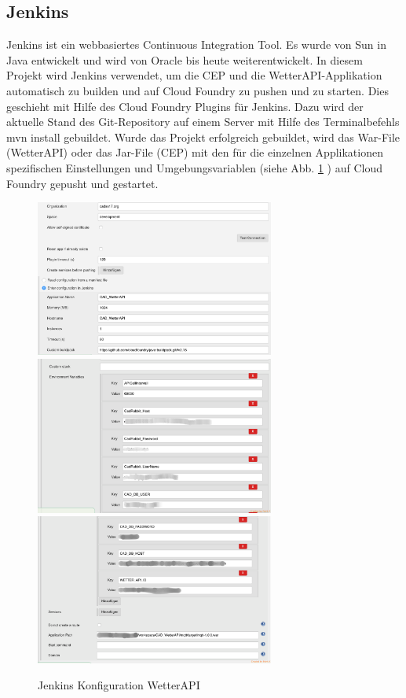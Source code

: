 \subsection{Jenkins}\label{Jenkins}
Jenkins ist ein webbasiertes Continuous Integration Tool. Es wurde von Sun in Java entwickelt und wird von Oracle bis heute weiterentwickelt. In diesem Projekt wird Jenkins verwendet, um die CEP und die WetterAPI-Applikation automatisch zu builden und auf Cloud Foundry zu pushen und zu starten.
Dies geschieht mit Hilfe des Cloud Foundry Plugins für Jenkins. Dazu wird der aktuelle Stand des Git-Repository auf einem Server mit Hilfe des Terminalbefehls mvn install gebuildet. Wurde das Projekt erfolgreich gebuildet, wird das War-File (WetterAPI) oder das Jar-File (CEP) mit den für die einzelnen Applikationen spezifischen Einstellungen und Umgebungsvariablen (siehe Abb. \ref{img:jenkinsConf} ) auf Cloud Foundry gepusht und gestartet.
\begin{figure}[htbp]
	\centering
	\includegraphics[width=0.7\textwidth]{Bilder/JenkinsBsp1.png}
	\includegraphics[width=0.7\textwidth]{Bilder/JenkinsBsp2.png}
	\includegraphics[width=0.7\textwidth]{Bilder/JenkinsBsp3.png}
	\caption{Jenkins Konfiguration WetterAPI}
	\label{img:jenkinsConf}
\end{figure} 
